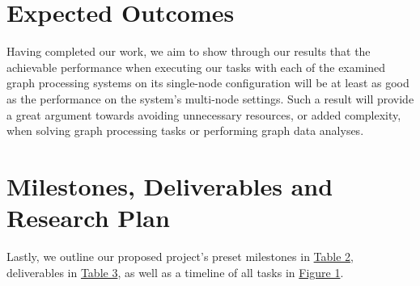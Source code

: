 \documentclass[a4paper,11pt]{article}
\begin{document}

\section{Expected Outcomes} \label{outcomes}

\par Having completed our work, we aim to show through our results that the achievable performance when executing our tasks with each of the examined graph processing systems on its single-node configuration will be at least as good as the performance on the system's multi-node settings. Such a result will provide a great argument towards avoiding unnecessary resources, or added complexity, when solving graph processing tasks or performing graph data analyses.




\section{Milestones, Deliverables and Research Plan} \label{milestones}

\par Lastly, we outline our proposed project's preset milestones in \hyperref[table:milestones]{Table 2}, deliverables in \hyperref[table:deliverables]{Table 3}, as well as a timeline of all tasks in \hyperref[fig:gantt]{Figure 1}.
\end{document}
